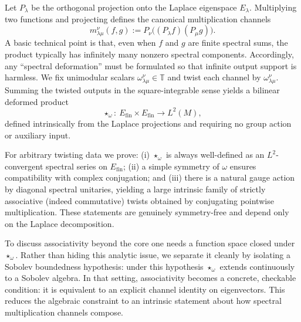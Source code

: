 \documentclass[11pt]{amsart}
\theoremstyle{plain}
\theoremstyle{definition}
\theoremstyle{remark}
\newcommand{\bbT}{\mathbb{T}}
\begin{document}
Let $P_\lambda$ be the orthogonal projection onto the Laplace eigenspace $E_\lambda$.  Multiplying two functions and projecting defines the canonical multiplication channels
\[
m^\nu_{\lambda\mu}(f,g):=P_\nu\bigl((P_\lambda f)(P_\mu g)\bigr).
\]
A basic technical point is that, even when $f$ and $g$ are finite spectral sums, the product typically has infinitely many nonzero spectral components.  Accordingly, any ``spectral deformation'' must be formulated so that infinite output support is harmless.  We fix unimodular scalars $\omega^\nu_{\lambda\mu}\in\bbT$ and twist each channel by $\omega^\nu_{\lambda\mu}$.  Summing the twisted outputs in the square-integrable sense yields a bilinear deformed product
\[
\star_\omega:\ E_{\mathrm{fin}}\times E_{\mathrm{fin}}\longrightarrow L^2(M),
\]
defined intrinsically from the Laplace projections and requiring no group action or auxiliary input.

For arbitrary twisting data we prove: (i) $\star_\omega$ is always well-defined as an $L^2$-convergent spectral series on $E_{\mathrm{fin}}$; (ii) a simple symmetry of $\omega$ ensures compatibility with complex conjugation; and (iii) there is a natural gauge action by diagonal spectral unitaries, yielding a large intrinsic family of strictly associative (indeed commutative) twists obtained by conjugating pointwise multiplication.  These statements are genuinely symmetry-free and depend only on the Laplace decomposition.

To discuss associativity beyond the core one needs a function space closed under $\star_\omega$.  Rather than hiding this analytic issue, we separate it cleanly by isolating a Sobolev boundedness hypothesis: under this hypothesis $\star_\omega$ extends continuously to a Sobolev algebra.  In that setting, associativity becomes a concrete, checkable condition: it is equivalent to an explicit channel identity on eigenvectors.  This reduces the algebraic constraint to an intrinsic statement about how spectral multiplication channels compose.
\end{document}
